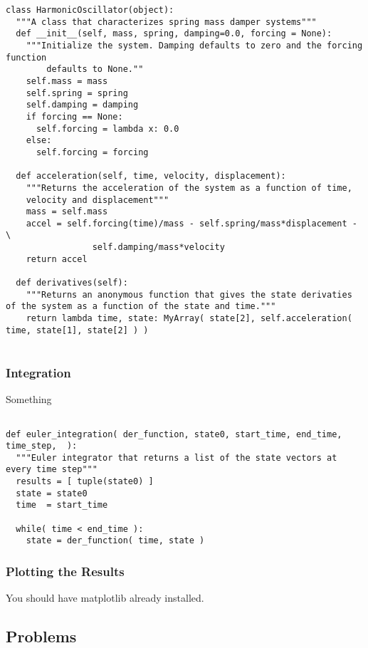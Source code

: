 \begin{verbatim}
class HarmonicOscillator(object):
  """A class that characterizes spring mass damper systems"""
  def __init__(self, mass, spring, damping=0.0, forcing = None):
    """Initialize the system. Damping defaults to zero and the forcing function 
        defaults to None.""
    self.mass = mass
    self.spring = spring
    self.damping = damping
    if forcing == None:
      self.forcing = lambda x: 0.0
    else:
      self.forcing = forcing

  def acceleration(self, time, velocity, displacement):
    """Returns the acceleration of the system as a function of time, 
    velocity and displacement"""
    mass = self.mass
    accel = self.forcing(time)/mass - self.spring/mass*displacement - \
                 self.damping/mass*velocity
    return accel

  def derivatives(self):
    """Returns an anonymous function that gives the state derivaties of the system as a function of the state and time."""
    return lambda time, state: MyArray( state[2], self.acceleration( time, state[1], state[2] ) )
      
\end{verbatim}

\subsubsection{Integration}
Something

\begin{verbatim}

def euler_integration( der_function, state0, start_time, end_time, time_step,  ):
  """Euler integrator that returns a list of the state vectors at every time step"""
  results = [ tuple(state0) ]
  state = state0
  time  = start_time

  while( time < end_time ):
    state = der_function( time, state )

\end{verbatim}

\subsubsection{Plotting the Results}

You should have matplotlib already installed.

\subsection{Problems}
